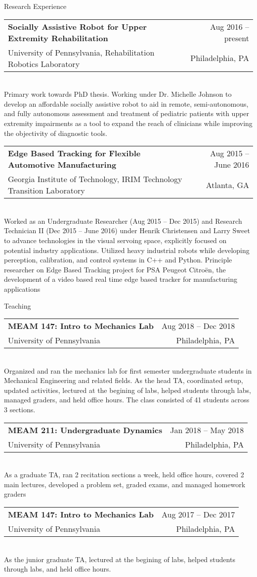 \documentclass[10pt, letter]{article}
\makeatletter
\newenvironment{cvsection}[1]{
    {\Large #1}
    \vspace{.1cm}
    
}{
}
\newcommand{\cvitem}[6]{
    \strut\hfill\begin{minipage}{\dimexpr\textwidth-1cm}
    \begin{tabular*}{\linewidth}{@{}l@{\extracolsep{\fill}}r@{}}
        \textbf{#1} & #4 -- #5\\
        #2 & #3\\
    \end{tabular*}\\[.05cm]
    #6
    \end{minipage}
    \vspace{.3cm}
}
\makeatother
\begin{document}
\begin{cvsection}{Research Experience}
    \cvitem{Socially Assistive Robot for Upper Extremity Rehabilitation}{University of Pennsylvania, Rehabilitation Robotics Laboratory}{Philadelphia, PA }{Aug 2016}{present}{Primary work towards PhD thesis. Working under Dr. Michelle Johnson to develop an affordable socially assistive robot to aid in remote, semi-autonomous, and fully autonomous assessment and treatment of pediatric patients with upper extremity impairments as a tool to expand the reach of clinicians while improving the objectivity of diagnostic tools.}

    \cvitem{Edge Based Tracking for Flexible Automotive Manufacturing}{Georgia Institute of Technology, IRIM Technology Transition Laboratory}{Atlanta, GA}{Aug 2015}{June 2016}{Worked as an Undergraduate Researcher (Aug 2015 – Dec 2015) and Research Technician II (Dec 2015 – June 2016) under Henrik Christensen and Larry Sweet to advance technologies in the visual servoing space, explicitly focused on potential industry applications. Utilized heavy industrial robots while developing perception, calibration, and control systems in C++ and Python. Principle researcher on Edge Based Tracking project for PSA Peugeot Citroën, the development of a video based real time edge based tracker for manufacturing applications}
\end{cvsection}

\begin{cvsection}{Teaching}
    \cvitem{MEAM 147: Intro to Mechanics Lab}{University of Pennsylvania}{Philadelphia, PA}{Aug 2018}{Dec 2018}{Organized and ran the mechanics lab for first semester undergraduate students in Mechanical Engineering and related fields. As the head TA, coordinated setup, updated activities, lectured at the begining of labs, helped students through labs, managed graders, and held office hours. The class consisted of 41 students across 3 sections.}
    
    \cvitem{MEAM 211: Undergraduate Dynamics}{University of Pennsylvania}{Philadelphia, PA}{Jan 2018}{May 2018}{As a graduate TA, ran 2 recitation sections a week, held office hours, covered 2 main lectures, developed a problem set, graded exams, and managed homework graders}

    \cvitem{MEAM 147: Intro to Mechanics Lab}{University of Pennsylvania}{Philadelphia, PA}{Aug 2017}{Dec 2017}{As the junior graduate TA, lectured at the begining of labs, helped students through labs, and held office hours.}
\end{cvsection}
\end{document}
